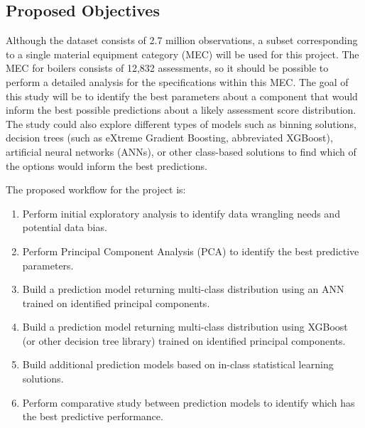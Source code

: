\documentclass[NewProceedings,letterpaper,NoPageNumbers,NoLineNumbers, DoubleSpace]{ascelike-new}
\begin{document}
\subsection{Proposed Objectives}

Although the dataset consists of 2.7 million observations, a subset corresponding to a single material equipment category (MEC) will be used for this project. The MEC for boilers consists of 12,832 assessments, so it should be possible to perform a detailed analysis for the specifications within this MEC. The goal of this study will be to identify the best parameters about a component that would inform the best possible predictions about a likely assessment score distribution.  The study could also explore different types of models such as binning solutions, decision trees (such as eXtreme Gradient Boosting, abbreviated XGBoost), artificial neural networks (ANNs), or other class-based solutions to find which of the options would inform the best predictions.

The proposed workflow for the project is:
\begin{enumerate}
\item Perform initial exploratory analysis to identify data wrangling needs and potential data bias.
\item Perform Principal Component Analysis (PCA) to identify the best predictive parameters.
\item Build a prediction model returning multi-class distribution using an ANN trained on identified principal components.
\item Build a prediction model returning multi-class distribution using XGBoost (or other decision tree library) trained on identified principal components.
\item Build additional prediction models based on in-class statistical learning solutions.
\item Perform comparative study between prediction models to identify which has the best predictive performance.
\end{enumerate}
\end{document}

